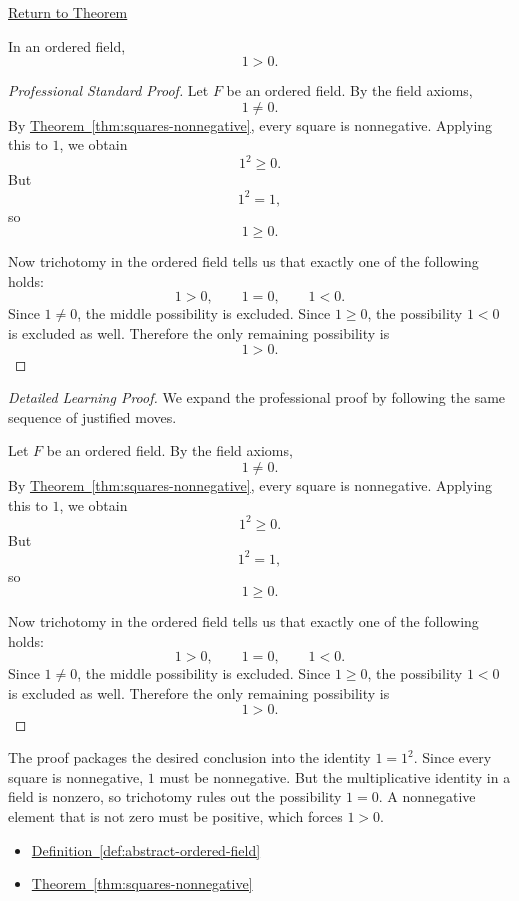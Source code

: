 \newpage
{}
\label{prf:one-positive}

\begin{remark*}[Return]
\hyperref[thm:one-positive]{Return to Theorem}
\end{remark*}

\begin{theorem*}[$1$ Is Positive]
In an ordered field,
\[
1>0.
\]
\end{theorem*}

\begin{proof}[Professional Standard Proof]
\LRAProofBodyStart
Let $F$ be an ordered field.  By the field axioms,
\[
1\neq 0.
\]
By \hyperref[thm:squares-nonnegative]{Theorem~\ref*{thm:squares-nonnegative}},
every square is nonnegative.  Applying this to $1$, we obtain
\[
1^2\ge 0.
\]
But
\[
1^2=1,
\]
so
\[
1\ge 0.
\]

Now trichotomy in the ordered field tells us that exactly one of the
following holds:
\[
1>0,\qquad 1=0,\qquad 1<0.
\]
Since $1\neq 0$, the middle possibility is excluded.  Since $1\ge 0$, the
possibility $1<0$ is excluded as well.  Therefore the only remaining
possibility is
\[
1>0.
\]
\end{proof}

\begin{proof}[Detailed Learning Proof]
\LRAProofBodyStart
We expand the professional proof by following the same sequence of justified moves.

Let $F$ be an ordered field.  By the field axioms,
\[
1\neq 0.
\]
By \hyperref[thm:squares-nonnegative]{Theorem~\ref*{thm:squares-nonnegative}},
every square is nonnegative.  Applying this to $1$, we obtain
\[
1^2\ge 0.
\]
But
\[
1^2=1,
\]
so
\[
1\ge 0.
\]

Now trichotomy in the ordered field tells us that exactly one of the
following holds:
\[
1>0,\qquad 1=0,\qquad 1<0.
\]
Since $1\neq 0$, the middle possibility is excluded.  Since $1\ge 0$, the
possibility $1<0$ is excluded as well.  Therefore the only remaining
possibility is
\[
1>0.
\]
\end{proof}

\begin{remark*}
The proof packages the desired conclusion into the identity $1=1^2$.  Since
every square is nonnegative, $1$ must be nonnegative.  But the multiplicative
identity in a field is nonzero, so trichotomy rules out the possibility
$1=0$.  A nonnegative element that is not zero must be positive, which
forces $1>0$.
\end{remark*}

\begin{dependencies}
\begin{itemize}
  \item \hyperref[def:abstract-ordered-field]{Definition~\ref*{def:abstract-ordered-field}}
  \item \hyperref[thm:squares-nonnegative]{Theorem~\ref*{thm:squares-nonnegative}}
\end{itemize}
\end{dependencies}

\clearpage
